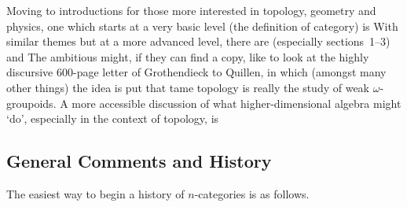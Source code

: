 Moving to introductions for those more interested in topology, geometry and
physics, one which starts at a very basic level (the definition of category)
is 
%
% 
%
With similar themes but at a more advanced level, there are
% 
%
%
(especially sections~1--3) and
%
%
%
The ambitious might, if they can find a copy, like to look at the highly
discursive 600-page letter of Grothendieck to Quillen,
% 
%
% 
in which (amongst many other things) the idea is put that tame topology is
really the study of weak $\omega$-groupoids.  A more accessible discussion of
what higher-dimensional algebra might `do', especially in the context of
topology, is
%
%



\subsection*{General Comments and History}


The easiest way to begin a history of $n$-categories is as follows.

